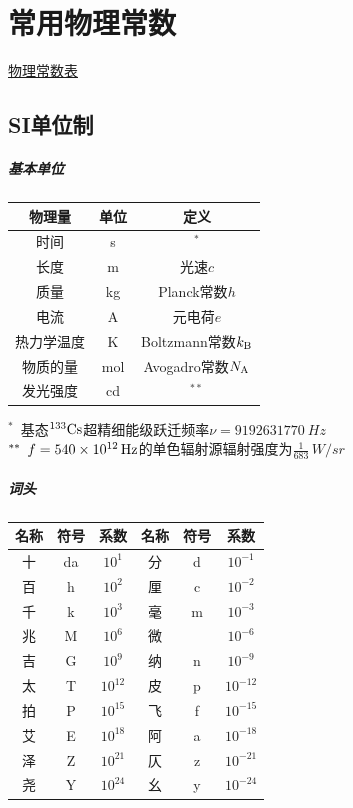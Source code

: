 \chapter{常用物理常数}
\href{https://en.wikipedia.org/wiki/List_of_physical_constants}{物理常数表}
\section{SI单位制}
\paragraph{基本单位}
\begin{center}
	\begin{tabular}{ccc}
		\toprule
		物理量&单位&定义\\
		\midrule
		时间&s&$^\ast$\\
		长度&m&光速$c$\\%
		质量&kg&Planck常数$h$\\%
		电流&A&元电荷$e$\\%
		热力学温度&K&Boltzmann常数$k_{\mathrm B}$\\%
		物质的量&mol&Avogadro常数$N_{\mathrm A}$\\
		发光强度&cd&$^{\ast\ast}$\\
		\bottomrule
	\end{tabular}
\end{center}
$^\ast\enspace$基态${^{133}\mathrm{Cs}}$超精细能级跃迁频率$\nu=\SI{9192631770}{Hz}$\\
\noindent
$^{\ast\ast}\enspace f=\SI{540E12}{Hz}$的单色辐射源辐射强度为$\frac1{683}\,\si{W/sr}$
\paragraph{词头}
\begin{center}
	\begin{tabular}{ccc|ccc}
		\toprule
		名称&符号&系数&名称&符号&系数\\
		\midrule
		十&da&$10^1$&分&d&$10^{-1}$\\
		百&h&$10^2$&厘&c&$10^{-2}$\\
		千&k&$10^3$&毫&m&$10^{-3}$\\
		兆&M&$10^6$&微&\si{\ \micro\ }&$10^{-6}$\\
		吉&G&$10^9$&纳&n&$10^{-9}$\\
		太&T&$10^{12}$&皮&p&$10^{-12}$\\
		拍&P&$10^{15}$&飞&f&$10^{-15}$\\
		艾&E&$10^{18}$&阿&a&$10^{-18}$\\
		泽&Z&$10^{21}$&仄&z&$10^{-21}$\\
		尧&Y&$10^{24}$&幺&y&$10^{-24}$\\
		\bottomrule
	\end{tabular}
\end{center}
